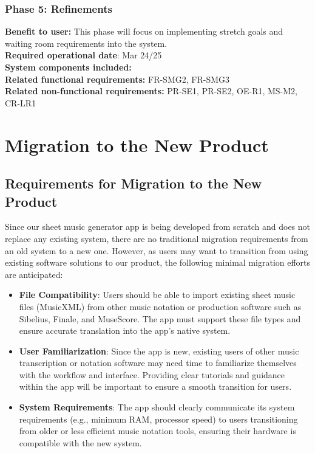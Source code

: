 \documentclass[12pt]{article}
\begin{document}
\subsubsection*{Phase 5: Refinements}
\textbf{Benefit to user:} This phase will focus on implementing stretch goals and waiting room requirements into the system. \\
\textbf{Required operational date}: Mar 24/25 \\
\textbf{System components included:} \\
\textbf{Related functional requirements:} FR-SMG2, FR-SMG3\\
\textbf{Related non-functional requirements:} PR-SE1, PR-SE2, OE-R1, MS-M2, CR-LR1 \\


\section{Migration to the New Product}
\subsection{Requirements for Migration to the New Product}
Since our sheet music generator app is being developed from scratch and does not replace any existing system, there are no traditional migration requirements from an old system to a new one. However, as users may want to transition from using existing software solutions to our product, the following minimal migration efforts are anticipated:
\begin{itemize}
    \item \textbf{File Compatibility}: Users should be able to import existing sheet music files (MusicXML) from other music notation or production software such as Sibelius, Finale, and MuseScore. The app must support these file types and ensure accurate translation into the app’s native system.
    
    \item \textbf{User Familiarization}: Since the app is new, existing users of other music transcription or notation software may need time to familiarize themselves with the workflow and interface. Providing clear tutorials and guidance within the app will be important to ensure a smooth transition for users.
    
    \item \textbf{System Requirements}: The app should clearly communicate its system requirements (e.g., minimum RAM, processor speed) to users transitioning from older or less efficient music notation tools, ensuring their hardware is compatible with the new system.
\end{itemize}
\end{document}

